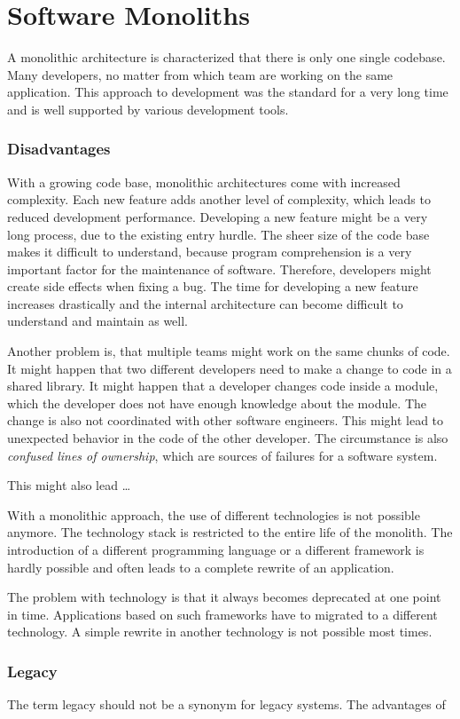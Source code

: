 \section{Software Monoliths}

A monolithic architecture is characterized that there is only one single codebase. Many developers, no matter from which team are working on the same application. This approach to development was the standard for a very long time and is well supported by various development tools.

\subsubsection{Disadvantages}

With a growing code base, monolithic architectures come with increased complexity. Each new feature adds another level of complexity, which leads to reduced development performance. Developing a new feature might be a very long process, due to the existing entry hurdle. The sheer size of the code base makes it difficult to understand, because program comprehension is a very important factor for the maintenance of software. Therefore, developers might create side effects when fixing a bug. The time for developing a new feature increases drastically and the internal architecture can become difficult to understand and maintain as well.

Another problem is, that multiple teams might work on the same chunks of code. It might happen that two different developers need to make a change to code in a shared library. It might happen that a developer changes code inside a module, which the developer does not have enough knowledge about the module. The change is also not coordinated with other software engineers. This might lead to unexpected behavior in the code of the other developer. The circumstance is also \textit{confused lines of ownership}, which are sources of failures for a software system.

This might also lead \dots

With a monolithic approach, the use of different technologies is not possible anymore. The technology stack is restricted to the entire life of the monolith. The introduction of a different programming language or a different framework is hardly possible and often leads to a complete rewrite of an application. \cite{book:2018:richardson:background:bff:microservices-patterns}

The problem with technology is that it always becomes deprecated at one point in time. Applications based on such frameworks have to migrated to a different technology. A simple rewrite in another technology is not possible most times.

\subsubsection{Legacy}

The term legacy should not be a synonym for legacy systems. The advantages of 